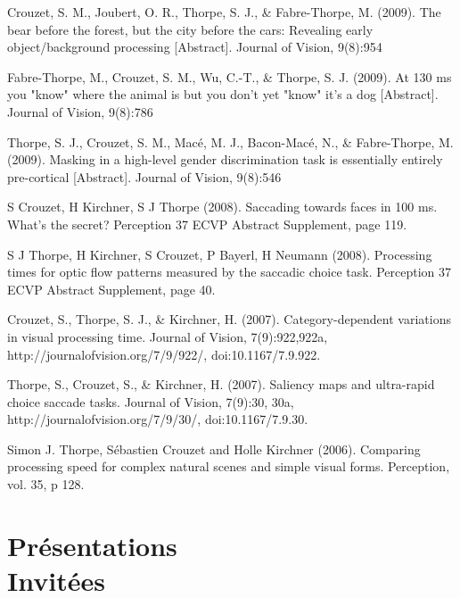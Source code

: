 \documentclass[margin,line]{resume}
\begin{document}
\begin{resume}
	\vspace{-2mm} Crouzet, S. M., Joubert, O. R., Thorpe, S. J., \& Fabre-Thorpe, M. (2009). The bear before the forest, but the city before the cars: Revealing early object/background processing [Abstract]. Journal of Vision, 9(8):954

	\vspace{-2mm} Fabre-Thorpe, M., Crouzet, S. M., Wu, C.-T., \& Thorpe, S. J. (2009). At 130 ms you "know" where the animal is but you don't yet "know" it's a dog [Abstract]. Journal of Vision, 9(8):786

	\vspace{-2mm} Thorpe, S. J., Crouzet, S. M., Macé, M. J., Bacon-Macé, N., \& Fabre-Thorpe, M. (2009). Masking in a high-level gender discrimination task is essentially entirely pre-cortical [Abstract]. Journal of Vision, 9(8):546

	\vspace{-2mm} S Crouzet, H Kirchner, S J Thorpe (2008). Saccading towards faces in 100 ms. What's the secret? Perception 37 ECVP Abstract Supplement, page 119. 
	
	\vspace{-2mm} S J Thorpe, H Kirchner, S Crouzet, P Bayerl, H Neumann (2008). Processing times for optic flow patterns measured by the saccadic choice task. Perception 37 ECVP Abstract Supplement, page 40.

	\vspace{-2mm} Crouzet, S., Thorpe, S. J., \& Kirchner, H. (2007). Category-dependent variations in visual processing time. Journal of Vision, 7(9):922,922a, http://journalofvision.org/7/9/922/, doi:10.1167/7.9.922.

	\vspace{-2mm} Thorpe, S., Crouzet, S., \& Kirchner, H. (2007). Saliency maps and ultra-rapid choice saccade tasks. Journal of Vision, 7(9):30, 30a, http://journalofvision.org/7/9/30/, doi:10.1167/7.9.30.

	\vspace{-2mm} Simon J. Thorpe, Sébastien Crouzet and Holle Kirchner (2006). Comparing processing speed for complex natural scenes and simple visual forms. Perception, vol. 35, p 128.

	\normalsize

\vspace{3mm}
\section{\mysidestyle Présentations\\Invitées}
    

\end{resume}
\end{document}
